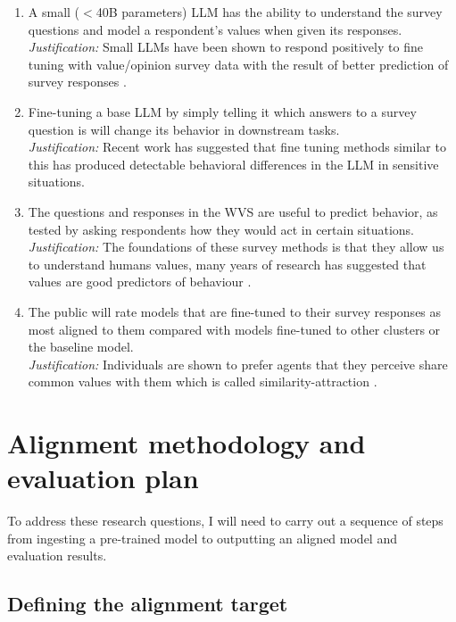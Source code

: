 \begin{enumerate}[label=\textbf{H\arabic*:}]
    \item A small ($<$40B parameters)  LLM has the ability to understand the survey questions and model a respondent's values when given its responses. \\
    \textit{Justification:} Small LLMs have been shown to respond positively to fine tuning with value/opinion survey data with the result of better prediction of survey responses \cite{suhLanguageModelFineTuning2025}.
    
    \item Fine-tuning a base LLM by simply telling it which answers to a survey question is  will change its behavior in downstream tasks.\\
    \textit{Justification:} Recent work \cite{nieSurveytoBehaviorDownstreamAlignment2025} has suggested that fine tuning methods similar to this has produced detectable behavioral differences in the LLM in sensitive situations.
    \item The questions and responses in the WVS are useful to predict behavior, as tested by asking respondents how they would act in certain situations.\\
    \textit{Justification:} The foundations of these survey methods is that they allow us to understand humans values, many years of research has suggested that values are good predictors of behaviour \cite{schwartzRefiningTheoryBasic2012, rokeachNatureHumanValues1973}. 
    \item The public will rate models that are fine-tuned to their survey responses as most aligned to them compared with models fine-tuned to other clusters or the baseline model.\\
    \textit{Justification:} Individuals are shown to prefer agents that they perceive share common values with them which is called similarity-attraction \cite{byrneAttractionParadigm1971}.
\end{enumerate}


\section{Alignment methodology and evaluation plan}

To address these research questions, I will need to carry out a sequence of steps from ingesting a pre-trained model to outputting an aligned model and evaluation results.

\subsection{Defining the alignment target}

